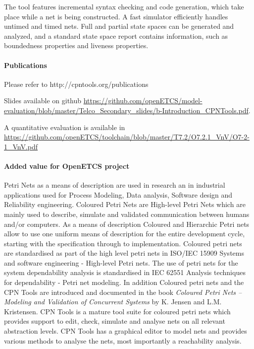 The tool features incremental syntax checking and code generation, which take place while a net is being constructed. A fast simulator efficiently handles untimed and timed nets. Full and partial state spaces can be generated and analyzed, and a standard state space report contains information, such as boundedness properties and liveness properties.

\paragraph{Publications} Please refer to http://cpntools.org/publications

Slides available on github \url{https://github.com/openETCS/model-evaluation/blob/master/Telco_Secondary_slides/b-Introduction_CPNTools.pdf}.

A quantitative evaluation is available in \url{https://github.com/openETCS/toolchain/blob/master/T7.2/O7.2.1_VnV/O7-2-1_VnV.pdf}

\paragraph{Added value for OpenETCS project}

Petri Nets as a means of description are used in research an in industrial applications used for Process Modeling, Data analysis, Software design and Reliability engineering. Coloured Petri Nets are  High-level Petri Nets which are mainly used to describe, simulate and validated communication between humans and/or computers. As a means of description Coloured and  Hierarchic Petri nets allow to use one uniform means of description for the entire development cycle, starting with  the specification through to  implementation. 
Coloured petri nets are standardised as part of the high level petri nets in ISO/IEC 15909 Systems and software engineering - High-level Petri nets. The use of petri nets for the system dependability analysis is standardised in IEC 62551 Analysis techniques for dependability - Petri net modeling. In addition Coloured petri nets and the CPN Tools are introduced and documented in the book \textit{Coloured Petri Nets -- Modeling and Validation of Concurrent Systems} by K. Jensen and L.M. Kristensen. CPN Tools is a mature tool suite for coloured petri nets which provides support to edit, check, simulate and analyse nets on all relevant abstraction levels. CPN Tools has a graphical editor to model nets and provides various methods to analyse the nets, most importantly a reachability analysis. 

